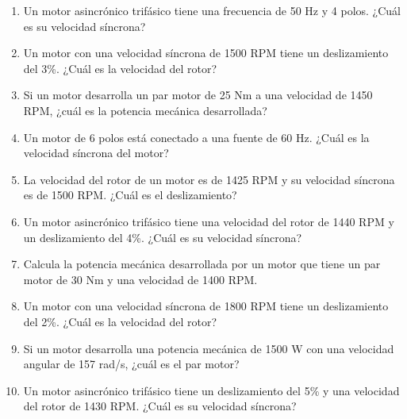 \documentclass[../main]{subfiles}
\begin{document}
\begin{enumerate}
    \item Un motor asincrónico trifásico tiene una frecuencia de 50 Hz y 4 polos. ¿Cuál es su velocidad síncrona?
    \item Un motor con una velocidad síncrona de 1500 RPM tiene un deslizamiento del 3\%. ¿Cuál es la velocidad del rotor?
    \item Si un motor desarrolla un par motor de 25 Nm a una velocidad de 1450 RPM, ¿cuál es la potencia mecánica desarrollada?
    \item Un motor de 6 polos está conectado a una fuente de 60 Hz. ¿Cuál es la velocidad síncrona del motor?
    \item La velocidad del rotor de un motor es de 1425 RPM y su velocidad síncrona es de 1500 RPM. ¿Cuál es el deslizamiento?
    \item Un motor asincrónico trifásico tiene una velocidad del rotor de 1440 RPM y un deslizamiento del 4\%. ¿Cuál es su velocidad síncrona?
    \item Calcula la potencia mecánica desarrollada por un motor que tiene un par motor de 30 Nm y una velocidad de 1400 RPM.
    \item Un motor con una velocidad síncrona de 1800 RPM tiene un deslizamiento del 2\%. ¿Cuál es la velocidad del rotor?
    \item Si un motor desarrolla una potencia mecánica de 1500 W con una velocidad angular de 157 rad/s, ¿cuál es el par motor?
    \item Un motor asincrónico trifásico tiene un deslizamiento del 5\% y una velocidad del rotor de 1430 RPM. ¿Cuál es su velocidad síncrona?

\end{enumerate}
\end{document}

